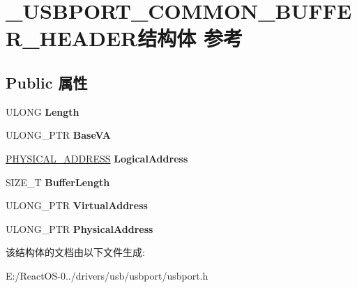 \hypertarget{struct___u_s_b_p_o_r_t___c_o_m_m_o_n___b_u_f_f_e_r___h_e_a_d_e_r}{}\section{\+\_\+\+U\+S\+B\+P\+O\+R\+T\+\_\+\+C\+O\+M\+M\+O\+N\+\_\+\+B\+U\+F\+F\+E\+R\+\_\+\+H\+E\+A\+D\+E\+R结构体 参考}
\label{struct___u_s_b_p_o_r_t___c_o_m_m_o_n___b_u_f_f_e_r___h_e_a_d_e_r}
\subsection*{Public 属性}
\begin{DoxyCompactItemize}
\item 
\mbox{\label{struct___u_s_b_p_o_r_t___c_o_m_m_o_n___b_u_f_f_e_r___h_e_a_d_e_r_aef684162cd59d96fa7036454f435d57d}} 
U\+L\+O\+NG {\bfseries Length}
\item 
\mbox{\label{struct___u_s_b_p_o_r_t___c_o_m_m_o_n___b_u_f_f_e_r___h_e_a_d_e_r_a51ab01736c8b6e422b3bfd42489f7021}} 
U\+L\+O\+N\+G\+\_\+\+P\+TR {\bfseries Base\+VA}
\item 
\mbox{\label{struct___u_s_b_p_o_r_t___c_o_m_m_o_n___b_u_f_f_e_r___h_e_a_d_e_r_ace2c145a7f28a04c5a6acc28f9f52254}} 
\hyperlink{union___l_a_r_g_e___i_n_t_e_g_e_r}{P\+H\+Y\+S\+I\+C\+A\+L\+\_\+\+A\+D\+D\+R\+E\+SS} {\bfseries Logical\+Address}
\item 
\mbox{\label{struct___u_s_b_p_o_r_t___c_o_m_m_o_n___b_u_f_f_e_r___h_e_a_d_e_r_acedbd4cc379026b4fbcec81aeb91ce23}} 
S\+I\+Z\+E\+\_\+T {\bfseries Buffer\+Length}
\item 
\mbox{\label{struct___u_s_b_p_o_r_t___c_o_m_m_o_n___b_u_f_f_e_r___h_e_a_d_e_r_a4aa0394400680b4dbd7d3b4c9d3a485b}} 
U\+L\+O\+N\+G\+\_\+\+P\+TR {\bfseries Virtual\+Address}
\item 
\mbox{\label{struct___u_s_b_p_o_r_t___c_o_m_m_o_n___b_u_f_f_e_r___h_e_a_d_e_r_a5c3cfbeae0754b872889039259dfc3bc}} 
U\+L\+O\+N\+G\+\_\+\+P\+TR {\bfseries Physical\+Address}
\end{DoxyCompactItemize}


该结构体的文档由以下文件生成\+:\begin{DoxyCompactItemize}
\item 
E\+:/\+React\+O\+S-\/0../drivers/usb/usbport/usbport.\+h\end{DoxyCompactItemize}

